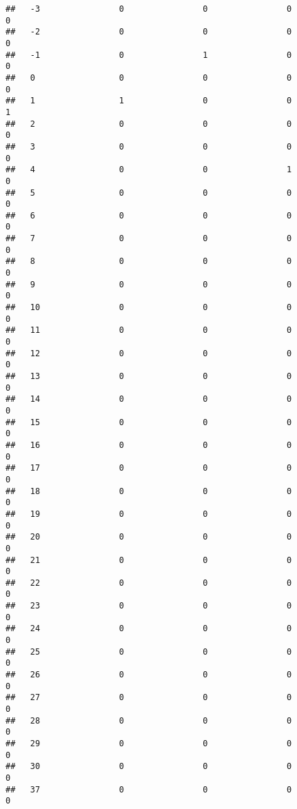 \documentclass[]{article}
\begin{document}
\begin{verbatim}
##   -3                0                0                0                0
##   -2                0                0                0                0
##   -1                0                1                0                0
##   0                 0                0                0                0
##   1                 1                0                0                1
##   2                 0                0                0                0
##   3                 0                0                0                0
##   4                 0                0                1                0
##   5                 0                0                0                0
##   6                 0                0                0                0
##   7                 0                0                0                0
##   8                 0                0                0                0
##   9                 0                0                0                0
##   10                0                0                0                0
##   11                0                0                0                0
##   12                0                0                0                0
##   13                0                0                0                0
##   14                0                0                0                0
##   15                0                0                0                0
##   16                0                0                0                0
##   17                0                0                0                0
##   18                0                0                0                0
##   19                0                0                0                0
##   20                0                0                0                0
##   21                0                0                0                0
##   22                0                0                0                0
##   23                0                0                0                0
##   24                0                0                0                0
##   25                0                0                0                0
##   26                0                0                0                0
##   27                0                0                0                0
##   28                0                0                0                0
##   29                0                0                0                0
##   30                0                0                0                0
##   37                0                0                0                0

\end{verbatim}
\end{document}
